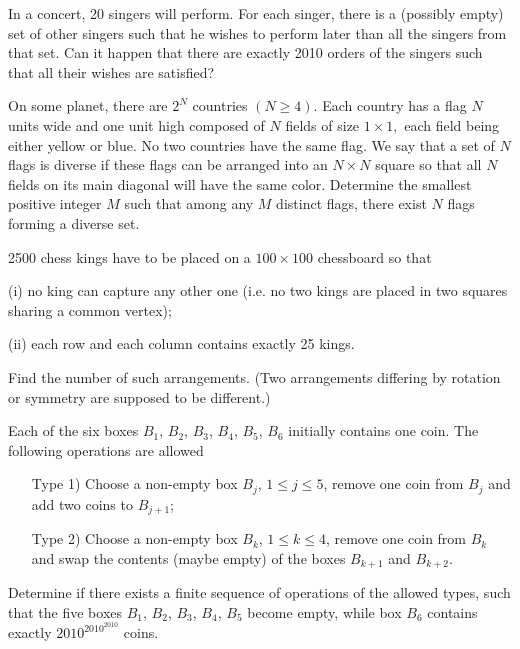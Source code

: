 \item[\textbf{C1.}]
In a concert, 20 singers will perform. For each singer, there is a (possibly empty) set of other singers such that he wishes to perform later than all the singers from that set. Can it happen that there are exactly 2010 orders of the singers such that all their wishes are satisfied?

\item[\textbf{C2.}]
On some planet, there are 
$2^N$
 countries 
$(N \geq 4).$
 Each country has a flag 
$N$
 units wide and one unit high composed of 
$N$
 fields of size 
$1 \times 1,$
 each field being either yellow or blue. No two countries have the same flag. We say that a set of 
$N$
 flags is diverse if these flags can be arranged into an 
$N \times N$
 square so that all 
$N$
 fields on its main diagonal will have the same color. Determine the smallest positive integer 
$M$
 such that among any 
$M$
 distinct flags, there exist 
$N$
 flags forming a diverse set.

\item[\textbf{C3.}]
2500 chess kings have to be placed on a 
$100 \times 100$
 chessboard so that
 
(i)
 no king can capture any other one (i.e. no two kings are placed in two squares sharing a common vertex);
 
(ii)
 each row and each column contains exactly 25 kings.


Find the number of such arrangements. (Two arrangements differing by rotation or symmetry are supposed to be different.)

\item[\textbf{C4.}]
Each of the six boxes 
$B_1$, 
$B_2$, 
$B_3$, 
$B_4$, 
$B_5$, 
$B_6$ initially contains one coin. The following operations are allowed

\begin{itemize}
\item[Type 1)] Choose a non-empty box 
$B_j$, 
 $1\leq j \leq 5$, 
 remove one coin from 
$B_j$
 and add two coins to 
$B_{j+1}$;

\item[Type 2)] Choose a non-empty box 
$B_k$, 
$1\leq k \leq 4$, 
 remove one coin from 
$B_k$
 and swap the contents (maybe empty) of the boxes 
$B_{k+1}$
 and 
$B_{k+2}$.
\end{itemize}


Determine if there exists a finite sequence of operations of the allowed types, such that the five boxes 
$B_1$, 
$B_2$, 
$B_3$, 
$B_4$, 
$B_5$
 become empty, while box 
$B_6$
 contains exactly 
$2010^{2010^{2010}}$
 coins.

